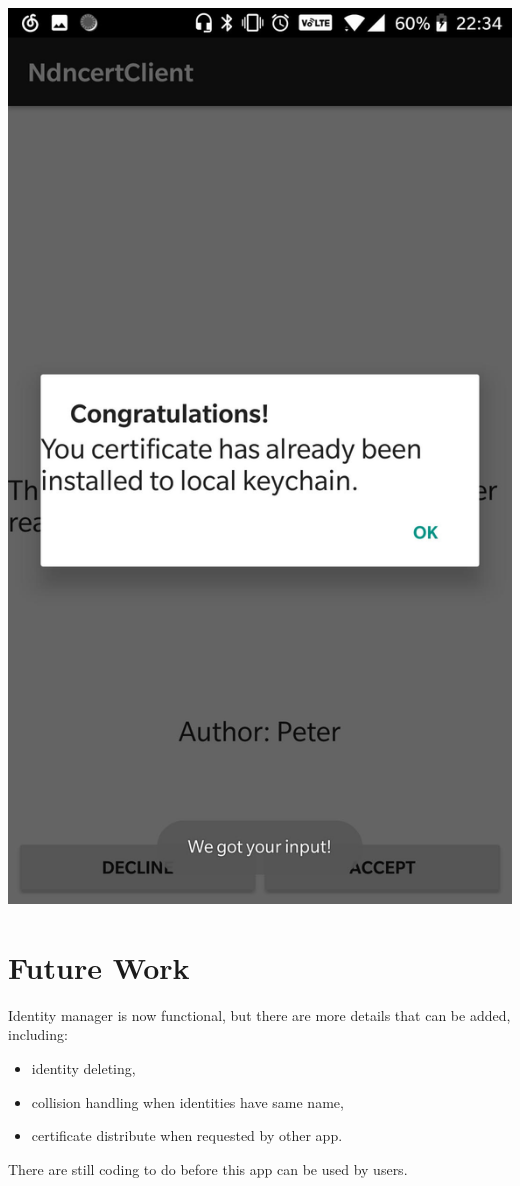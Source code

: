 \documentclass[a0,portrait]{poster}
\begin{document}
\begin{multicols}{2}
\begin{minipage}[b]{\linewidth}
	\includegraphics[width=0.24\linewidth]{figures/download.jpg}
\end{minipage}






\section*{Future Work}

\par 
	Identity manager is now functional, but there are more details that can be added, including:
	\begin{itemize}
		\item identity deleting, 
		\item collision handling when identities have same name,
		\item certificate distribute when requested by other app.
	\end{itemize} 
	There are still coding to do before this app can be used by users.



\end{multicols}
\end{document}
